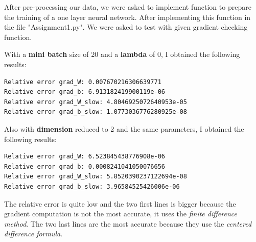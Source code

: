 \documentclass{article}
\begin{document}
After pre-processing our data, we were asked to implement function to prepare the training of a one layer neural network. After implementing this function in the file "Assignment1.py". We were asked to test with given gradient checking function.

With a \textbf{mini batch} size of 20 and a \textbf{lambda} of 0, I obtained the following results:
\begin{verbatim}
Relative error grad_W: 0.007670216306639771
Relative error grad_b: 6.913182419900119e-06
Relative error grad_W_slow: 4.8046925072640953e-05
Relative error grad_b_slow: 1.0773036776280925e-08
\end{verbatim}

Also with \textbf{dimension} reduced to 2 and the same parameters, I obtained the following results:
\begin{verbatim}
Relative error grad_W: 6.523845438776908e-06
Relative error grad_b: 0.0008241041050076656
Relative error grad_W_slow: 5.8520390237122694e-08
Relative error grad_b_slow: 3.96584525426006e-06
\end{verbatim}

The relative error is quite low and the two first lines is bigger because the gradient computation is not the most accurate, it uses the \textit{finite difference method}. The two last lines are the most accurate because they use the \textit{centered difference formula}.
\end{document}
